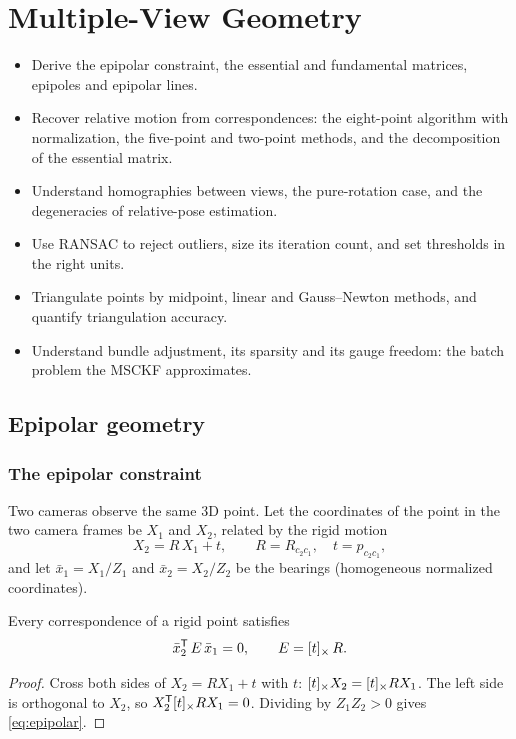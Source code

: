 \chapter{Multiple-View Geometry}
\label{ch:multiview}

\begin{objectives}
\begin{itemize}
  \item Derive the epipolar constraint, the essential and fundamental matrices, epipoles and epipolar lines.
  \item Recover relative motion from correspondences: the eight-point algorithm with normalization, the five-point and two-point methods, and the
        decomposition of the essential matrix.
  \item Understand homographies between views, the pure-rotation case, and the degeneracies of relative-pose estimation.
  \item Use RANSAC to reject outliers, size its iteration count, and set thresholds in the right units.
  \item Triangulate points by midpoint, linear and Gauss--Newton methods, and quantify triangulation accuracy.
  \item Understand bundle adjustment, its sparsity and its gauge freedom: the batch problem the MSCKF approximates.
\end{itemize}
\end{objectives}

\section{Epipolar geometry}

\subsection{The epipolar constraint}

Two cameras observe the same 3D point. Let the coordinates of the point in the two camera frames be $X_1$ and $X_2$, related by the rigid motion
\begin{equation}
  X_2 = R\,X_1 + t, \qquad R = R_{c_2c_1},\quad t = p_{c_2c_1},
\end{equation}
and let $\bar x_1 = X_1/Z_1$ and $\bar x_2 = X_2/Z_2$ be the bearings (homogeneous normalized coordinates).

\begin{theorem}
\label{thm:epipolar}
Every correspondence of a rigid point satisfies
\begin{equation}
  \bar x_2^{\mathsf{T}}\,E\,\bar x_1 = 0, \qquad E = [t]_{\times}\,R .
  \label{eq:epipolar}
\end{equation}
\end{theorem}
\begin{proof}
Cross both sides of $X_2 = RX_1 + t$ with $t$: $[t]_{\times}X_2 = [t]_{\times}RX_1$. The left side is orthogonal to $X_2$, so $X_2^{\mathsf{T}}[t]_{\times}RX_1 = 0$. Dividing by $Z_1Z_2 > 0$ gives
\eqref{eq:epipolar}.
\end{proof}

